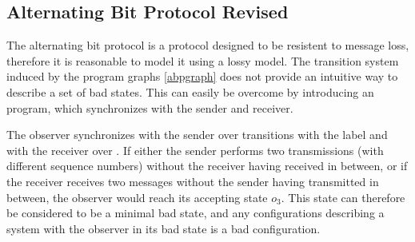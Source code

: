\subsection{Alternating Bit Protocol Revised}
The alternating bit protocol is a protocol designed to be resistent to message loss, therefore it is reasonable to model it using a lossy model. The transition system induced by the program graphs \ref{abpgraph} does not provide an intuitive way to describe a set  of bad states. This can easily be overcome by introducing an  program, which synchronizes with the sender and receiver.

\begin{figure}[h!]
\abpobserver
\label{abpobserver}
\end{figure}

The observer synchronizes with the sender over transitions with the label  and with the receiver over . If either the sender performs two transmissions (with different sequence numbers) without the receiver having received in between, or if the receiver receives two messages without the sender having transmitted in between, the observer would reach its accepting state $o_3$. This state can therefore be considered to be a minimal bad state, and any configurations describing a system with the observer in its bad state is a bad configuration.
